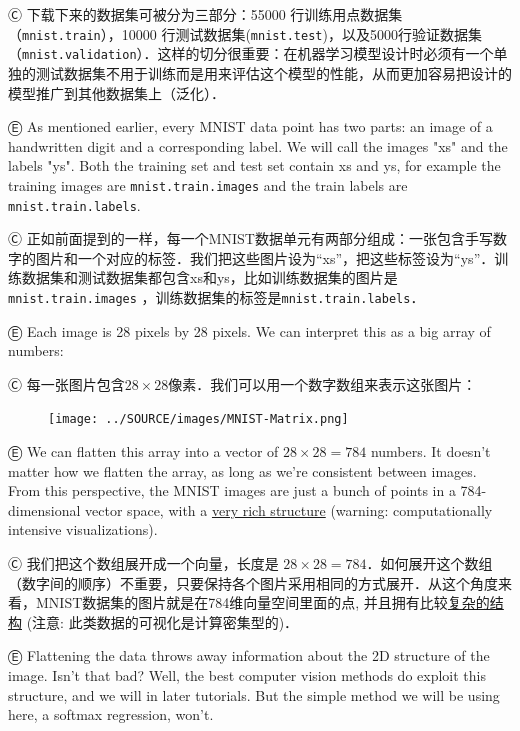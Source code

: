 Ⓒ 下载下来的数据集可被分为三部分：55000 行训练用点数据集（\lstinline{mnist.train}），10000 行测试数据集(\lstinline{mnist.test})，以及5000行验证数据集（\lstinline{mnist.validation}）．这样的切分很重要：在机器学习模型设计时必须有一个单独的测试数据集不用于训练而是用来评估这个模型的性能，从而更加容易把设计的模型推广到其他数据集上（泛化）．

Ⓔ \textcolor{etc}{As mentioned earlier, every MNIST data point has two parts: an image of a handwritten digit and a corresponding label. We will call the images "xs" and the labels "ys". Both the training set and test set contain xs and ys, for example the training images are \lstinline{mnist.train.images} and the train labels are \lstinline{mnist.train.labels}.}

Ⓒ 正如前面提到的一样，每一个MNIST数据单元有两部分组成：一张包含手写数字的图片和一个对应的标签．我们把这些图片设为“xs”，把这些标签设为“ys”．训练数据集和测试数据集都包含xs和ys，比如训练数据集的图片是\lstinline{mnist.train.images} ，训练数据集的标签是\lstinline{mnist.train.labels}．

Ⓔ \textcolor{etc}{Each image is 28 pixels by 28 pixels. We can interpret this as a big array of numbers:}

Ⓒ 每一张图片包含$ 28 \times 28$像素．我们可以用一个数字数组来表示这张图片：

\begin{figure}[htbp]
\centering
\texttt{[image: ../SOURCE/images/MNIST-Matrix.png]}
\caption{}
\end{figure}

Ⓔ \textcolor{etc}{We can flatten this array into a vector of $ 28 \times 28 = 784$ numbers. It doesn't matter how we flatten the array, as long as we're consistent between images. From this perspective, the MNIST images are just a bunch of points in a 784-dimensional vector space, with a \href{http://colah.github.io/posts/2014-10-Visualizing-MNIST/}{very rich structure} (warning: computationally intensive visualizations).}

Ⓒ 我们把这个数组展开成一个向量，长度是 $ 28 \times 28 = 784$．如何展开这个数组（数字间的顺序）不重要，只要保持各个图片采用相同的方式展开．从这个角度来看，MNIST数据集的图片就是在784维向量空间里面的点, 并且拥有比较\href{http://colah.github.io/posts/2014-10-Visualizing-MNIST/}{复杂的结构} (注意: 此类数据的可视化是计算密集型的)．

Ⓔ \textcolor{etc}{Flattening the data throws away information about the 2D structure of the image. Isn't that bad? Well, the best computer vision methods do exploit this structure, and we will in later tutorials. But the simple method we will be using here, a softmax regression, won't.}

